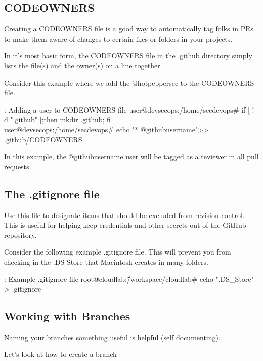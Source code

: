 \subsection{CODEOWNERS}

\justify
Creating a CODEOWNERS file
is a good way to automatically tag folks in PRs to make them aware of
changes to certain files or folders in your projects.

\justify
In it's most basic form, the CODEOWNERS file in the .github directory
simply lists the file(s) and the owner(s) on a line together.

\justify
Consider this example where we add the @hotpeppersec to the CODEOWNERS
file.

\begin{mybox}{\thetcbcounter: Adding a user to CODEOWNERS file}
      user@devsecops:/home/secdevops\# if [ ! -d ".github" ];then mkdir .github; fi\\
      user@devsecops:/home/secdevops\# echo "* @githubusername">> .github/CODEOWNERS
\end{mybox}

In this example, the @githubusername user will be tagged as a reviewer
in all pull requests.


\subsection{The .gitignore file}
\justify
Use this file to designate items that should be excluded from revision
control. This is useful for helping keep credentials and other secrets
out of the GitHub repository.

\justify
Consider the following example .gitignore file. This will prevent you
from checking in the .DS-Store that Macintosh creates in many folders.

\begin{mybox}{\thetcbcounter: Example .gitignore file}
      root@cloudlab:\~/workspace/cloudlab\# echo ".DS\_Store" > .gitignore
\end{mybox}

\subsection{Working with Branches}

Naming your branches something useful is helpful (self documenting).

Let's look at how to create a branch

